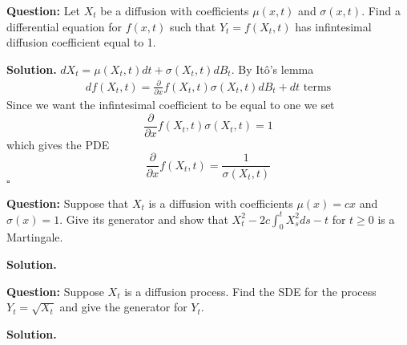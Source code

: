 \documentclass{article}
\begin{document}
\begin{tcolorbox}[colframe=black,colback=gray!5,boxrule=0.5pt]
\textbf{Question:} Let $X_t$ be a diffusion with coefficients $\mu(x,t)$ and $\sigma(x,t)$. Find a differential equation for $f(x,t)$ such that $Y_t = f(X_t,t)$ has infintesimal diffusion coefficient equal to 1. 
\end{tcolorbox}
\textbf{Solution.} $dX_t = \mu(X_t,t)dt + \sigma(X_t,t)dB_t$. By Itô's lemma
\begin{align*}
    df(X_t,t) = \frac{\partial}{\partial x} f(X_t,t)\sigma(X_t,t)dB_t + \text{$dt$ terms}
\end{align*}
Since we want the infintesimal coefficient to be equal to one we set 
$$\frac{\partial}{\partial x} f(X_t,t)\sigma(X_t,t) = 1$$
which gives the PDE
$$\frac{\partial}{\partial x} f(X_t,t)= \frac{1}{\sigma(X_t,t)}$$
$\square$

\begin{tcolorbox}[colframe=black,colback=gray!5,boxrule=0.5pt]
\textbf{Question:} Suppose that $X_t$ is a diffusion with coefficients $\mu(x) = cx$ and $\sigma(x)=1$. Give its generator and show that $X_t^2-2c\int_0^tX_s^2ds-t$ for $t\geq0$ is a Martingale.
\end{tcolorbox}
\textbf{Solution.}

\begin{tcolorbox}[colframe=black,colback=gray!5,boxrule=0.5pt]
\textbf{Question:} Suppose $X_t$ is a diffusion process. Find the SDE for the process $Y_t = \sqrt{X_t}$ and give the generator for $Y_t$.
\end{tcolorbox}
\textbf{Solution.}

\end{document}
